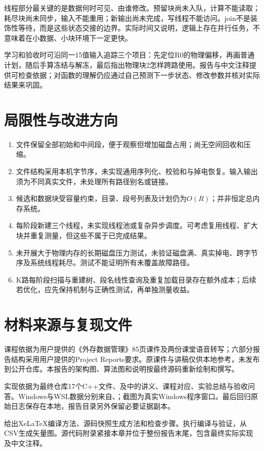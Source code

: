 线程部分最关键的是数据何时可见、由谁修改。预留块尚未入队，计算不能读取；耗尽块尚未同步，输入不能重用；新输出尚未完成，写线程不能访问。join不是装饰性等待，而是这些状态交接的边界。实际时间又说明，逻辑上存在并行任务，不意味着在小数据、小块环境下一定更快。

学习和验收时可沿同一15值输入追踪三个项目：先定位R0的物理偏移，再画普通计划，随后手算冻结与解冻，最后指出物理块2怎样跨路使用。报告与中文注释提供可检查依据；对函数的理解仍应通过自己预测下一步状态、修改参数并核对实际结果来巩固。

\section{局限性与改进方向}
\begin{enumerate}
\item 文件保留全部初始和中间段，便于观察但增加磁盘占用；尚无空间回收和压缩。
\item 文件结构采用本机字节序，未实现通用序列化、校验和与掉电恢复。输入输出须为不同真实文件，未处理所有路径别名或链接。
\item 候选和数据块受容量约束，目录、段号列表及计划仍为$O(R)$；并非恒定总内存系统。
\item 每阶段新建三个线程，未实现线程池或复杂异步调度。可考虑复用线程、扩大块并重复测量，但这些不属于已完成结果。
\item 未开展大于物理内存的长期磁盘压力测试，未验证磁盘满、真实掉电、跨字节序及系统线程耗尽。测试不能证明所有未覆盖故障路径。
\item K路每阶段扫描与重建树、段名线性查询及重复加载目录存在额外成本；后续若优化，应先保持机制与正确性测试，再单独测量收益。
\end{enumerate}

\section{材料来源与复现文件}
课程依据为用户提供的《外存数据管理》85页课件及两份课堂语音转写；六部分报告结构采用用户提供的Project Reports要求。原课件与讲稿仅供本地参考，未发布到公开仓库。本报告的架构图、算法图和说明按最终源码重新绘制和撰写。

实现依据为最终仓库17个C++文件、及中的讲义、课程对应、实验总结与验收问答。Windows与WSL数据分别来自、；截图为真实Windows程序窗口。最后回归原始日志保存在本地，报告目录另外保留必要证据副本。

给出XeLaTeX编译方法、源码快照生成方法和检查步骤。执行编译与验证，从CSV生成矢量图。源代码附录紧接本章并位于整份报告末尾，包含最终实际实现及中文注释。
